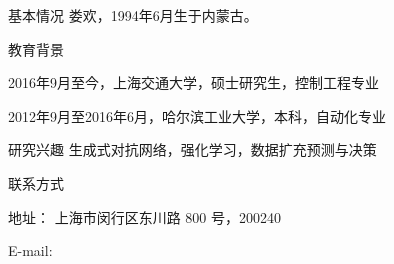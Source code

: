 \begin{resume}
  \begin{resumesection}{基本情况}
    娄欢，1994年6月生于内蒙古。
  \end{resumesection}

  \begin{resumelist}{教育背景}
    \item 2016年9月至今，上海交通大学，硕士研究生，控制工程专业
    \item 2012年9月至2016年6月，哈尔滨工业大学，本科，自动化专业
  \end{resumelist}

  \begin{resumesection}{研究兴趣}
    生成式对抗网络，强化学习，数据扩充预测与决策
  \end{resumesection}

  \begin{resumelist}{联系方式}
    \item 地址： 上海市闵行区东川路 800 号，200240
    \item E-mail: 
  \end{resumelist}
\end{resume}
